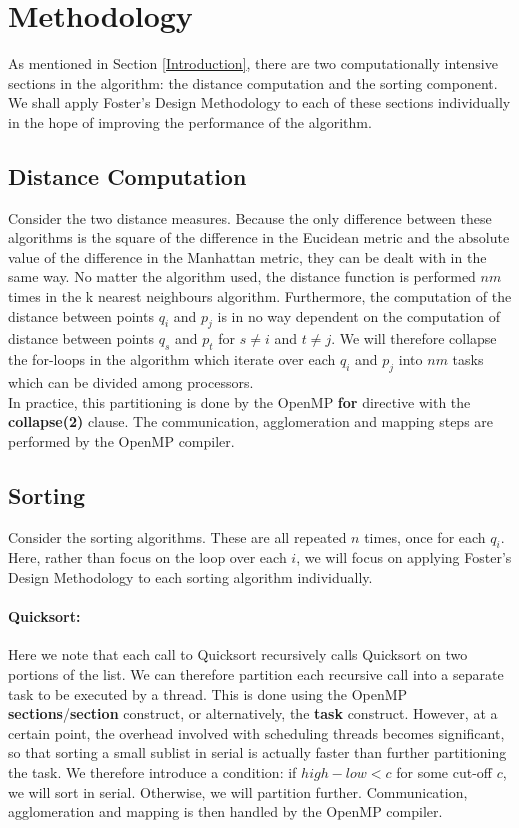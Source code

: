 \documentclass[10pt]{article}
\begin{document}
\section{Methodology}\label{Methodology}
As mentioned in Section \ref{Introduction}, there are two computationally intensive sections in the algorithm: the distance computation and the sorting component. We shall apply Foster's Design Methodology to each of these sections individually in the hope of improving the performance of the algorithm.
\subsection{Distance Computation}
Consider the two distance measures. Because the only difference between these algorithms is the square of the difference in the Eucidean metric and the absolute value of the difference in the Manhattan metric, they can be dealt with in the same way. No matter the algorithm used, the distance function is performed $nm$ times in the k nearest neighbours algorithm. Furthermore, the computation of the distance between points $q_{i}$ and $p_{j}$ is in no way dependent on the computation of distance between points $q_{s}$ and $p_{t}$ for $s\neq i$ and $t\neq j$. We will therefore collapse the for-loops in the algorithm which iterate over each  $q_{i}$ and $p_{j}$ into $nm$ tasks which can be divided among processors. 
\\
In practice, this partitioning is done by the OpenMP \textbf{for} directive with the \textbf{collapse(2)} clause. The communication, agglomeration and mapping steps are performed by the OpenMP compiler.
\subsection{Sorting}
Consider the sorting algorithms. These are all repeated $n$ times, once for each $q_{i}$. Here, rather than focus on the loop over each $i$, we will focus on applying Foster's Design Methodology to each sorting algorithm individually.
\paragraph{Quicksort:}
Here we note that each call to Quicksort recursively calls Quicksort on two portions of the list. We can therefore partition each recursive call into a separate task to be executed by a thread. This is done using the OpenMP \textbf{sections}/\textbf{section} construct, or alternatively, the \textbf{task} construct. However, at a certain point, the overhead involved with scheduling threads becomes significant, so that sorting a small sublist in serial is actually faster than further partitioning the task. We therefore introduce a condition: if $high-low<c$ for some cut-off $c$, we will sort in serial. Otherwise, we will partition further. Communication, agglomeration and mapping is then handled by the OpenMP compiler.
\end{document}
